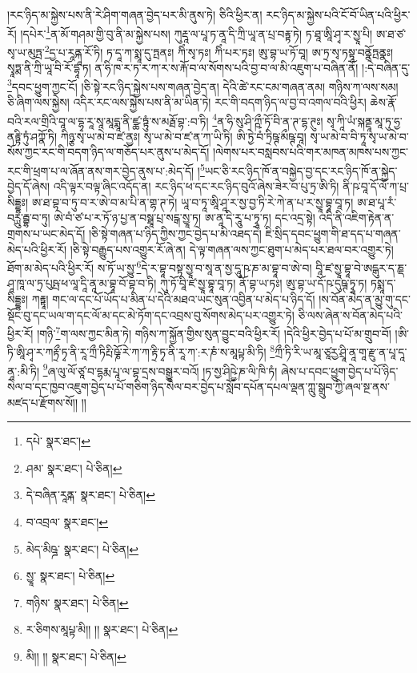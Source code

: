 །རང་ཉིད་མ་སྐྱེས་པས་ནི་རེ་ཤིག་གཞན་བྱེད་པར་མི་ནུས་ཏེ། ཅིའི་ཕྱིར་ན། རང་ཉིད་མ་སྐྱེས་པའི་ངོ་བོ་ཡིན་པའི་ཕྱིར་རོ། །དཔེར་\footnote{དཔེ་  སྣར་ཐང་། }ན་མོ་གཤམ་གྱི་བུ་ནི་མ་སྐྱེས་པས། ཀུརྡཱ་ལ་པཱ་ཏ་ནཱ་དི་ཀྲི་ཡཱ་ན་པྲ་བརྟྟ་ཏེ། ཏ་ཐཱ་ཨཱི་ཤྭ་ར་སྱཱ་པི། ཨ་ཐ་ཙ་སྭ་ཡ་མུཏྤ་\footnote{ཤམ་  སྣར་ཐང་།  པེ་ཅིན། }དྱ་པ་རཱནྐཱ་རོ་ཏི། ཏ་དཱ་ཀ་སྨཱ་དུ་ཏྤནཿ། ཀིཾ་སྭ་ཏཿ། ཀིཾ་པར་ཏཿ། ཨུ་བྷ་ཡ་ཏོ་བཱ། ཨ་ཏྲ་སྭ་ཏསྟཱ་བནྣོཏྤནྣཿ། སྭཱཏྨ་ནི་ཀྲི་ཡཱ་བི་རོ་དྷཱ་ཏ། ན་ཧི་ཁ་ར་ཏ་ར་ཀ་ར་ས་རྐོ་བ་ལ་སོགས་པའི་བྱ་བ་ལ་མི་འཇུག་པ་བཞིན་ནོ། །:དེ་བཞིན་དུ་\footnote{དེ་བཞིན་རཱནྐ་  སྣར་ཐང་།  པེ་ཅིན། }དབང་ཕྱུག་ཀྱང་ངོ། །ཅི་སྟེ་རང་ཉིད་སྐྱེས་པས་གཞན་བྱེད་ན། དེའི་ཚེ་རང་ངམ་གཞན་ནམ། གཉིས་ཀ་ལས་སམ། ཅི་ཞིག་ལས་སྐྱེས། འདིར་རང་ལས་སྐྱེས་པས་ནི་མ་ཡིན་ཏེ། རང་གི་བདག་ཉིད་ལ་བྱ་བ་འགལ་བའི་ཕྱིར། ཆེས་རྣོ་བའི་རལ་གྲིའི་བཱ་ལ་དྷྭ་རཱ་སཱ་མཱདྨཱ་ནི་ཛྪ་ཏྟུཾ་ས་མརྠོ་བྷ་:བ་ཏི། \footnote{བ་འབྲལ་  སྣར་ཐང་། }ན་ཧི་སུ་ཤི་ཀྵྀ་ཏོ་བི་ན་ཊ་དྷ་ཊུཿ། སྭ་ཀཱི་ཡཾ་སྐནྡཱ་མཱ་ཏུ་ཧྱ་ནརྟྟི་ཏུཾ་ཤཀྣོ་ཏི། ཀིཉྩ་སྭ་ཡ་མེ་བ་ཛ་ནྱཿ། སྭ་ཡ་མེ་བ་ཛ་ན་ཀ་ཡི་ཏི། ཨི་ཏྱེ་བཾ་ཏྲིཥྚ་མྀཥྚ་བཱ། སྭ་ཡ་མེ་བ་བི་ཏཱ་སྭ་ཡ་མེ་བ་སོས་ཀྱང་རང་གི་བདག་ཉིད་ལ་གཅོད་པར་ནུས་པ་མེད་དོ། །ལེགས་པར་བསླབས་པའི་གར་མཁན་མཁས་པས་ཀྱང་རང་གི་ཕྲག་པ་ལ་ཞོན་ནས་གར་བྱེད་ནུས་པ་:མེད་དོ། །\footnote{མེད་མིཥྜ་  སྣར་ཐང་།  པེ་ཅིན། }ཡང་ཅི་རང་ཉིད་ཁོ་ན་བསྐྱེད་བྱ་དང་རང་ཉིད་ཁོ་ན་སྐྱེད་བྱེད་དོ་ཞེས། འདི་ལྟར་བལྟ་ཞིང་འདོད་ན། རང་ཉིད་ཕ་དང་རང་ཉིད་བུའོ་ཞེས་ཟེར་བ་པུ་ཏྲ་ཨི་ཏི། ནི་ཥ་བཱ་དོ་ལོ་ཀ་པྲ་སིདྡྷཿ། ཨ་ཐ་བྷ་བ་ཏུ་བ་ར་ཨེ་བ་མ་པི་ན་གྷ་ཊ་ཏེ། ཡཱ་བ་ཏཱ་ཨཱི་ཤཱ་ར་སྱ་བྱ་ཏི་རེ་ཀེ་ན་པ་ར་སྱཱ་བྷཱ་བཱ་ཏ། ཨ་ཐ་པཱ་རཾ་བཪྻུ་རྦྷ་བ་ཏུ། ཨེ་བཾ་ཙ་པ་ར་ཏོ་ཉ་པྱ་ན་བསྠཱ་པྲ་སངྒ་སྱཱ་ཏ། ཨ་ནཱ་དི་རཱུ་པ་ཏྭཱ་ཏ། དང་འདྲ་སྟེ། འདི་ནི་འཇིག་རྟེན་ན་གྲགས་པ་ཡང་མེད་དོ། །ཅི་སྟེ་གཞན་པ་ཉིད་ཀྱིས་ཀྱང་བྱེད་པ་མི་འཐད་དེ། ཇི་སྲིད་དབང་ཕྱུག་གི་ཐ་དད་པ་གཞན་མེད་པའི་ཕྱིར་རོ། །ཅི་སྟེ་བརྒྱུད་པས་འགྱུར་རོ་ཞེ་ན། དེ་ལྟ་གཞན་ལས་ཀྱང་ཐུག་པ་མེད་པར་ཐལ་བར་འགྱུར་ཏེ། ཐོག་མ་མེད་པའི་ཕྱིར་རོ། ས་ཏོ་ཡ་སྱུ་\footnote{སྱཱ་  སྣར་ཐང་།  པེ་ཅིན། }དེ་ར་བྷཱ་བསྟ་སྱཱ་བ་སཱ་ན་སྱ་དཱུ་ཥ་ཎ་མ་བྷཱ་བ་ཨེ་བ། བཱི་ཛ་སྱཱ་བྷཱ་བེ་ཨདྒུར་ད་ཎྡ་ཤཱ་ཁཱ་ལ་ཏྲ་པུཥྤ་ཕ་ལཱ་དཱི་ནཱ་མ་བྷཱ་བོ་བྷ་བ་ཏི། ཀུ་ཏོ་བཱི་ཛ་སྱཱ་བྷཱ་བཱ་ཏ། ནོ་བྷ་ཡ་ཏཿ། ཨུ་བྷ་ཡ་དོ་ཥ་དུཥྚ་ཏྭཱ་ཏ། ཏསྨཱ་ད་སིདྡྷཿ། ཀརྟྟཱ། གང་ལ་དང་པོ་ཡོད་པ་མིན་པ་དེའི་མཐའ་ཡང་སུན་འབྱིན་པ་མེད་པ་ཉིད་དོ། །ས་བོན་མེད་ན་མྱུ་གུ་དང་སྡོང་བུ་དང་ཡལ་ག་དང་ལོ་མ་དང་མེ་ཏོག་དང་འབྲས་བུ་སོགས་མེད་པར་འགྱུར་ཏེ། ཅི་ལས་ཞེན་ས་བོན་མེད་པའི་ཕྱིར་རོ། །གཉི་\footnote{གཉིས་  སྣར་ཐང་།  པེ་ཅིན། }ག་ལས་ཀྱང་མིན་ཏེ། གཉིས་ཀ་སྐྱོན་གྱིས་སུན་བྱུང་བའི་ཕྱིར་རོ། །དེའི་ཕྱིར་བྱེད་པ་པོ་མ་གྲུབ་བོ། །ཨི་ཏི་ཨཱི་ཤྭ་ར་ཀརྟྲྀ་ཏྭ་ནི་རཱ་ཀྲྀ་ཏིརྤི་ཥྞོ་རེ་ཀ་ཀ་རྟྲི་ཏྭ་ནི་རཱ་ཀ་:ར་ཎཾ་ས་མཱཔྟ་མི་ཏི། \footnote{ར་ཅིགས་མཱཔྟ་མི།། །།   སྣར་ཐང་།  པེ་ཅིན། }ཀྲྀ་ཏི་རི་ཡ་མཱ་ཙཱརྱ་ཤྲཱི་ནཱ་གཱ་རྫུ་ན་པཱ་དཱ་ནཱ་:མི་ཏི། \footnote{མི།། །།   སྣར་ཐང་།  པེ་ཅིན། }ཞ་ལུ་ལོ་ཙཱ་བ་དྷརྨ་པཱ་ལ་བྷ་དྲས་བསྒྱུར་བའོ། །ཏ་སྱ་ཤིཥྱེ་ཎ་ལི་ཁི་ཏཾ། ཞེས་པ་དབང་ཕྱུག་བྱེད་པ་པོ་ཉིད་སེལ་བ་དང་ཁྱབ་འཇུག་བྱེད་པ་པོ་གཅིག་ཉིད་སེལ་བར་བྱེད་པ་སློབ་དཔོན་དཔལ་ལྡན་ཀླུ་སྒྲུབ་ཀྱི་ཞལ་སྔ་ནས་མཛད་པ་རྫོགས་སོ།། །།